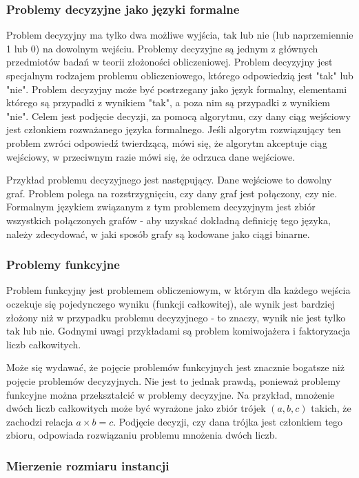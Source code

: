 		\subsubsection{Problemy decyzyjne jako języki formalne}

Problem decyzyjny ma tylko dwa możliwe wyjścia, tak lub nie (lub naprzemiennie 1 lub 0) na dowolnym wejściu.
Problemy decyzyjne są jednym z głównych przedmiotów badań w teorii złożoności obliczeniowej. Problem decyzyjny jest specjalnym rodzajem problemu obliczeniowego, którego odpowiedzią jest "tak" lub "nie". Problem decyzyjny może być postrzegany jako język formalny, elementami którego są przypadki z wynikiem "tak", a poza nim są przypadki z wynikiem "nie". Celem jest podjęcie decyzji, za pomocą algorytmu, czy dany ciąg wejściowy jest członkiem rozważanego języka formalnego. Jeśli algorytm rozwiązujący ten problem zwróci odpowiedź twierdzącą, mówi się, że algorytm akceptuje ciąg wejściowy, w przeciwnym razie mówi się, że odrzuca dane wejściowe.

Przykład problemu decyzyjnego jest następujący. Dane wejściowe to dowolny graf. Problem polega na rozstrzygnięciu, czy dany graf jest połączony, czy nie. Formalnym językiem związanym z tym problemem decyzyjnym jest zbiór wszystkich połączonych grafów - aby uzyskać dokładną definicję tego języka, należy zdecydować, w jaki sposób grafy są kodowane jako ciągi binarne.

		\subsubsection{Problemy funkcyjne}

Problem funkcyjny jest problemem obliczeniowym, w którym dla każdego wejścia oczekuje się pojedynczego wyniku (funkcji całkowitej), ale wynik jest bardziej złożony niż w przypadku problemu decyzyjnego - to znaczy, wynik nie jest tylko tak lub nie. Godnymi uwagi przykładami są problem komiwojażera i faktoryzacja liczb całkowitych.

Może się wydawać, że pojęcie problemów funkcyjnych jest znacznie bogatsze niż pojęcie problemów decyzyjnych. Nie jest to jednak prawdą, ponieważ problemy funkcyjne można przekształcić w problemy decyzyjne. Na przykład, mnożenie dwóch liczb całkowitych może być wyrażone jako zbiór trójek $(a, b, c)$ takich, że zachodzi relacja $a × b = c$. Podjęcie decyzji, czy dana trójka jest członkiem tego zbioru, odpowiada rozwiązaniu problemu mnożenia dwóch liczb.

		\subsubsection{Mierzenie rozmiaru instancji}

